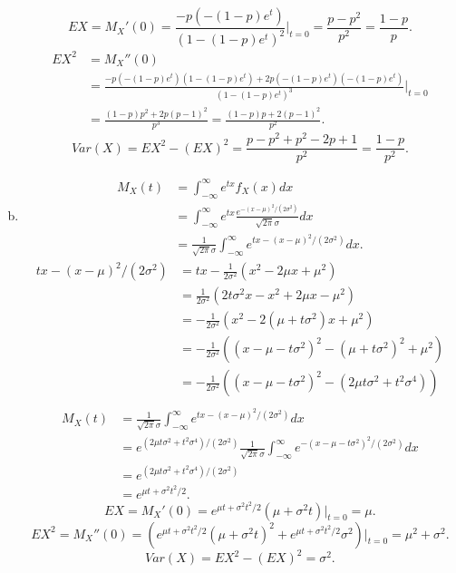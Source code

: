 \documentclass[14pt]{elegantbook}
\begin{document}
\begin{solution}
\begin{enumerate}[(a)]
            \[EX=M_X'(0)=\frac{-p(-(1-p)e^t)}{(1-(1-p)e^t)^2}|_{t=0}=\frac{p-p^2}{p^2}=\frac{1-p}{p}. \]
            \begin{align*}
                EX^2&=M_X''(0)\\
                &=\frac{-p(-(1-p)e^t)(1-(1-p)e^t)+2p(-(1-p)e^t)(-(1-p)e^t)}{(1-(1-p)e^t)^3}|_{t=0}\\
                &=\frac{(1-p)p^2+2p(p-1)^2}{p^3}=\frac{(1-p)p+2(p-1)^2}{p^2}. 
            \end{align*}
            \[Var(X)=EX^2-(EX)^2=\frac{p-p^2+p^2-2p+1}{p^2}=\frac{1-p}{p^2}. \]
            \item \begin{align*}
                M_X(t)&=\int_{-\infty}^\infty e^{tx}f_X(x) dx\\
                &=\int_{-\infty}^\infty e^{tx}\frac{e^{-(x-\mu)^2/(2\sigma^2)}}{\sqrt{2\pi}\sigma}dx\\
                &=\frac{1}{\sqrt{2\pi}\sigma}\int_{-\infty}^\infty e^{tx-(x-\mu)^2/(2\sigma^2)}dx. 
            \end{align*}
            \begin{align*}
                tx-(x-\mu)^2/(2\sigma^2)&=tx-\frac{1}{2\sigma^2}(x^2-2\mu x+\mu^2)\\
                &=\frac{1}{2\sigma^2}(2t\sigma^2x-x^2+2\mu x-\mu^2)\\
                &=-\frac{1}{2\sigma^2}(x^2-2(\mu+t\sigma^2)x+\mu^2)\\
                &=-\frac{1}{2\sigma^2}((x-\mu-t\sigma^2)^2-(\mu+t\sigma^2)^2+\mu^2)\\
                &=-\frac{1}{2\sigma^2}((x-\mu-t\sigma^2)^2-(2\mu t\sigma^2+t^2\sigma^4))\\
            \end{align*}
            \begin{align*}
                M_X(t)&=\frac{1}{\sqrt{2\pi}\sigma}\int_{-\infty}^\infty e^{tx-(x-\mu)^2/(2\sigma^2)}dx\\&=e^{(2\mu t\sigma^2+t^2\sigma^4)/(2\sigma^2)}\frac{1}{\sqrt{2\pi}\sigma}\int_{-\infty}^\infty e^{-(x-\mu-t\sigma^2)^2/(2\sigma^2)}dx\\
                &=e^{(2\mu t\sigma^2+t^2\sigma^4)/(2\sigma^2)}\\
                &=e^{\mu t+\sigma^2t^2/2}.
            \end{align*}
            \[EX=M_X'(0)=e^{\mu t+\sigma^2t^2/2}(\mu+\sigma^2t)|_{t=0}=\mu. \]
            \[EX^2=M_X''(0)=\left(e^{\mu t+\sigma^2t^2/2}(\mu+\sigma^2t)^2+e^{\mu t+\sigma^2t^2/2}\sigma^2\right)|_{t=0}=\mu^2+\sigma^2. \]
            \[Var(X)=EX^2-(EX)^2=\sigma^2. \]
        \end{enumerate}
    \end{solution}
\end{document}
